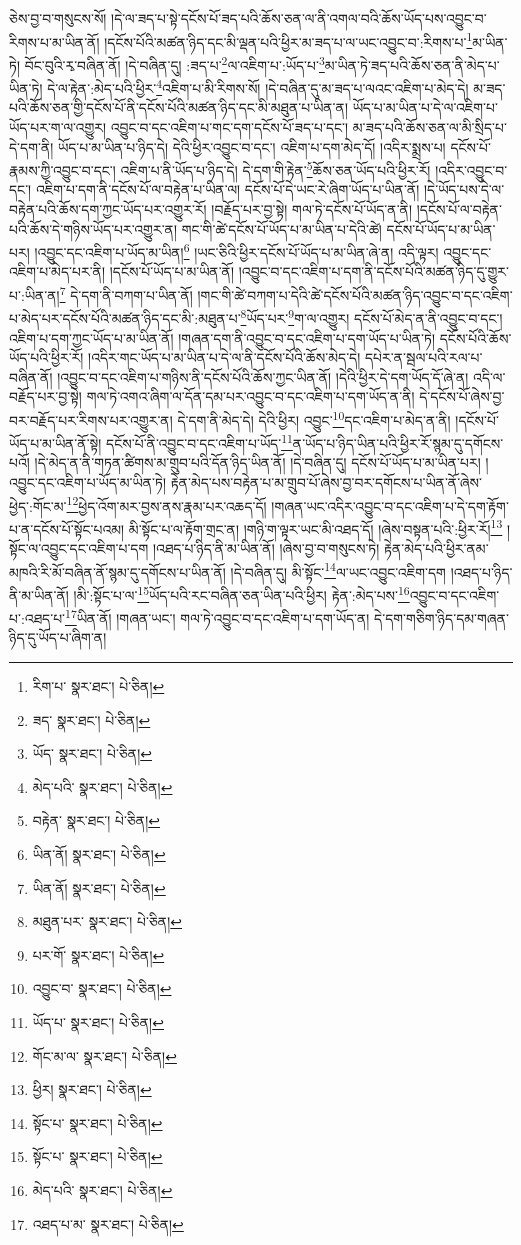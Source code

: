 ཅེས་བྱ་བ་གསུངས་སོ། །དེ་ལ་ཟད་པ་སྟེ་དངོས་པོ་ཟད་པའི་ཆོས་ཅན་ལ་ནི་འགལ་བའི་ཆོས་ཡོད་པས་འབྱུང་བ་རིགས་པ་མ་ཡིན་ནོ། །དངོས་པོའི་མཚན་ཉིད་དང་མི་ལྡན་པའི་ཕྱིར་མ་ཟད་པ་ལ་ཡང་འབྱུང་བ་:རིགས་པ་\footnote{རིག་པ་  སྣར་ཐང་།  པེ་ཅིན། }མ་ཡིན་ཏེ། བོང་བུའི་རྭ་བཞིན་ནོ། །དེ་བཞིན་དུ། :ཟད་པ་\footnote{ཟད་  སྣར་ཐང་།  པེ་ཅིན། }ལ་འཇིག་པ་:ཡོད་པ་\footnote{ཡོད་  སྣར་ཐང་།  པེ་ཅིན། }མ་ཡིན་ཏེ་ཟད་པའི་ཆོས་ཅན་ནི་མེད་པ་ཡིན་ཏེ། དེ་ལ་རྟེན་:མེད་པའི་ཕྱིར་\footnote{མེད་པའི་  སྣར་ཐང་།  པེ་ཅིན། }འཇིག་པ་མི་རིགས་སོ། །དེ་བཞིན་དུ་མ་ཟད་པ་ལའང་འཇིག་པ་མེད་དེ། མ་ཟད་པའི་ཆོས་ཅན་གྱི་དངོས་པོ་ནི་དངོས་པོའི་མཚན་ཉིད་དང་མི་མཐུན་པ་ཡིན་ན། ཡོད་པ་མ་ཡིན་པ་དེ་ལ་འཇིག་པ་ཡོད་པར་ག་ལ་འགྱུར། འབྱུང་བ་དང་འཇིག་པ་གང་དག་དངོས་པོ་ཟད་པ་དང་། མ་ཟད་པའི་ཆོས་ཅན་ལ་མི་སྲིད་པ་དེ་དག་ནི། ཡོད་པ་མ་ཡིན་པ་ཉིད་དེ། དེའི་ཕྱིར་འབྱུང་བ་དང་། འཇིག་པ་དག་མེད་དོ། །འདིར་སྨྲས་པ། དངོས་པོ་རྣམས་ཀྱི་འབྱུང་བ་དང་། འཇིག་པ་ནི་ཡོད་པ་ཉིད་དེ། དེ་དག་གི་རྟེན་\footnote{བརྟེན་  སྣར་ཐང་།  པེ་ཅིན། }ཆོས་ཅན་ཡོད་པའི་ཕྱིར་རོ། །འདིར་འབྱུང་བ་དང་། འཇིག་པ་དག་ནི་དངོས་པོ་ལ་བརྟེན་པ་ཡིན་ལ། དངོས་པོ་དེ་ཡང་རེ་ཞིག་ཡོད་པ་ཡིན་ནོ། །དེ་ཡོད་པས་དེ་ལ་བརྟེན་པའི་ཆོས་དག་ཀྱང་ཡོད་པར་འགྱུར་རོ། །བརྗོད་པར་བྱ་སྟེ། གལ་ཏེ་དངོས་པོ་ཡོད་ན་ནི། །དངོས་པོ་ལ་བརྟེན་པའི་ཆོས་དེ་གཉིས་ཡོད་པར་འགྱུར་ན། གང་གི་ཚེ་དངོས་པོ་ཡོད་པ་མ་ཡིན་པ་དེའི་ཚེ། དངོས་པོ་ཡོད་པ་མ་ཡིན་པར། །འབྱུང་དང་འཇིག་པ་ཡོད་མ་ཡིན།\footnote{ཡིན་ནོ།  སྣར་ཐང་།  པེ་ཅིན། } །ཡང་ཅིའི་ཕྱིར་དངོས་པོ་ཡོད་པ་མ་ཡིན་ཞེ་ན། འདི་ལྟར། འབྱུང་དང་འཇིག་པ་མེད་པར་ནི། །དངོས་པོ་ཡོད་པ་མ་ཡིན་ནོ། །འབྱུང་བ་དང་འཇིག་པ་དག་ནི་དངོས་པོའི་མཚན་ཉིད་དུ་གྱུར་པ་:ཡིན་ན།\footnote{ཡིན་ནོ།  སྣར་ཐང་།  པེ་ཅིན། } དེ་དག་ནི་བཀག་པ་ཡིན་ནོ། །གང་གི་ཚེ་བཀག་པ་དེའི་ཚེ་དངོས་པོའི་མཚན་ཉིད་འབྱུང་བ་དང་འཇིག་པ་མེད་པར་དངོས་པོའི་མཚན་ཉིད་དང་མི་:མཐུན་པ་\footnote{མཐུན་པར་  སྣར་ཐང་།  པེ་ཅིན། }ཡོད་པར་\footnote{པར་གོ་  སྣར་ཐང་།  པེ་ཅིན། }ག་ལ་འགྱུར། དངོས་པོ་མེད་ན་ནི་འབྱུང་བ་དང་། འཇིག་པ་དག་ཀྱང་ཡོད་པ་མ་ཡིན་ནོ། །གཞན་དག་ནི་འབྱུང་བ་དང་འཇིག་པ་དག་ཡོད་པ་ཡིན་ཏེ། དངོས་པོའི་ཆོས་ཡོད་པའི་ཕྱིར་རོ། །འདིར་གང་ཡོད་པ་མ་ཡིན་པ་དེ་ལ་ནི་དངོས་པོའི་ཆོས་མེད་དེ། དཔེར་ན་སྦལ་པའི་རལ་པ་བཞིན་ནོ། །འབྱུང་བ་དང་འཇིག་པ་གཉིས་ནི་དངོས་པོའི་ཆོས་ཀྱང་ཡིན་ནོ། །དེའི་ཕྱིར་དེ་དག་ཡོད་དོ་ཞེ་ན། འདི་ལ་བརྗོད་པར་བྱ་སྟེ། གལ་ཏེ་འགའ་ཞིག་ལ་དོན་དམ་པར་འབྱུང་བ་དང་འཇིག་པ་དག་ཡོད་ན་ནི། དེ་དངོས་པོ་ཞེས་བྱ་བར་བརྗོད་པར་རིགས་པར་འགྱུར་ན། དེ་དག་ནི་མེད་དེ། དེའི་ཕྱིར། འབྱུང་\footnote{འབྱུང་བ་  སྣར་ཐང་།  པེ་ཅིན། }དང་འཇིག་པ་མེད་ན་ནི། །དངོས་པོ་ཡོད་པ་མ་ཡིན་ནོ་སྟེ། དངོས་པོ་ནི་འབྱུང་བ་དང་འཇིག་པ་ཡོད་\footnote{ཡོད་པ་  སྣར་ཐང་།  པེ་ཅིན། }ན་ཡོད་པ་ཉིད་ཡིན་པའི་ཕྱིར་རོ་སྙམ་དུ་དགོངས་པའོ། །དེ་མེད་ན་ནི་གཏན་ཚིགས་མ་གྲུབ་པའི་དོན་ཉིད་ཡིན་ནོ། །དེ་བཞིན་དུ། དངོས་པོ་ཡོད་པ་མ་ཡིན་པར། །འབྱུང་དང་འཇིག་པ་ཡོད་མ་ཡིན་ཏེ། རྟེན་མེད་པས་བརྟེན་པ་མ་གྲུབ་པོ་ཞེས་བྱ་བར་དགོངས་པ་ཡིན་ནོ་ཞེས་ཕྱེད་:གོང་མ་\footnote{གོང་མ་ལ་  སྣར་ཐང་།  པེ་ཅིན། }ཕྱེད་འོག་མར་བྱས་ནས་རྣམ་པར་འཆད་དོ། །གཞན་ཡང་འདིར་འབྱུང་བ་དང་འཇིག་པ་དེ་དག་རྟོག་པ་ན་དངོས་པོ་སྟོང་པའམ། མི་སྟོང་པ་ལ་རྟོག་གྲང་ན། །གཉི་ག་ལྟར་ཡང་མི་འཐད་དོ། །ཞེས་བསྟན་པའི་:ཕྱིར་རོ།\footnote{ཕྱིར།  སྣར་ཐང་།  པེ་ཅིན། } །སྟོང་ལ་འབྱུང་དང་འཇིག་པ་དག །འཐད་པ་ཉིད་ནི་མ་ཡིན་ནོ། །ཞེས་བྱ་བ་གསུངས་ཏེ། རྟེན་མེད་པའི་ཕྱིར་ནམ་མཁའི་རི་མོ་བཞིན་ནོ་སྙམ་དུ་དགོངས་པ་ཡིན་ནོ། །དེ་བཞིན་དུ། མི་སྟོང་\footnote{སྟོང་པ་  སྣར་ཐང་།  པེ་ཅིན། }ལ་ཡང་འབྱུང་འཇིག་དག །འཐད་པ་ཉིད་ནི་མ་ཡིན་ནོ། །མི་:སྟོང་པ་ལ་\footnote{སྟོང་པ་  སྣར་ཐང་།  པེ་ཅིན། }ཡོད་པའི་རང་བཞིན་ཅན་ཡིན་པའི་ཕྱིར། རྟེན་:མེད་པས་\footnote{མེད་པའི་  སྣར་ཐང་།  པེ་ཅིན། }འབྱུང་བ་དང་འཇིག་པ་:འཐད་པ་\footnote{འཐད་པ་མ་  སྣར་ཐང་།  པེ་ཅིན། }ཡིན་ནོ། །གཞན་ཡང་། གལ་ཏེ་འབྱུང་བ་དང་འཇིག་པ་དག་ཡོད་ན། དེ་དག་གཅིག་ཉིད་དམ་གཞན་ཉིད་དུ་ཡོད་པ་ཞིག་ན། 